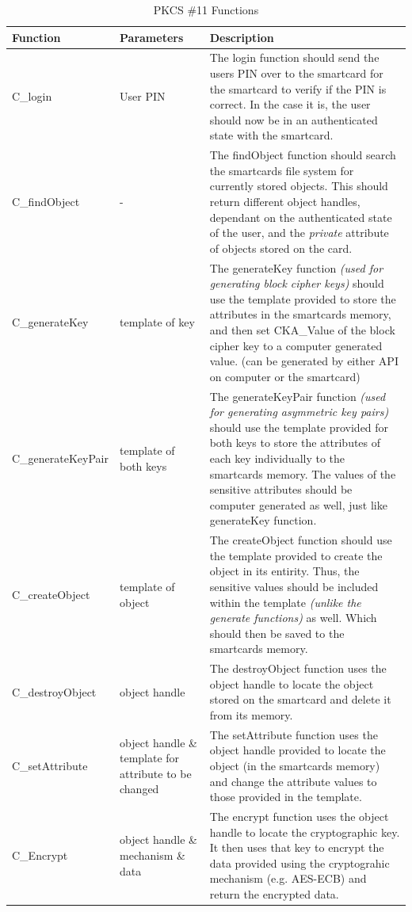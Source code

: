 \documentclass[bsc,frontabs,twoside,singlespacing,parskip,deptreport]{infthesis}     %
\begin{document}
\begin{table}[H]
\hskip-1.5cm\begin{tabular}{|l|p{5cm}|p{8cm}|}
\hline
Function & Parameters & Description\\
\hline
C\_login & User PIN & The login function should send the users PIN over to the smartcard for the smartcard to verify if the PIN is correct. In the case it is, the user should now be in an authenticated state with the smartcard.\\
\hline 
C\_findObject & - & The findObject function should search the smartcards file system for currently stored objects. This should return different object handles, dependant on the authenticated state of the user, and the \textit{private} attribute of objects stored on the card.\\
\hline
C\_generateKey & template of key & The generateKey function \textit{(used for generating block cipher keys)} should use the template provided to store the attributes in the smartcards memory, and then set CKA\_Value of the block cipher key to a computer generated value. (can be generated by either API on computer or the smartcard)\\
\hline 
C\_generateKeyPair & template of both keys & The generateKeyPair function \textit{(used for generating asymmetric key pairs)} should use the template provided for both keys to store the attributes of each key individually to the smartcards memory. The values of the sensitive attributes should be computer generated as well, just like generateKey function.\\
\hline
C\_createObject & template of object & The createObject function should use the template provided to create the object in its entirity. Thus, the sensitive values should be included within the template \textit{(unlike the generate functions)} as well. Which should then be saved to the smartcards memory.\\
\hline
C\_destroyObject & object handle & The destroyObject function uses the object handle to locate the object stored on the smartcard and delete it from its memory. \\
\hline 
C\_setAttribute & object handle \& template for attribute to be changed & The setAttribute function uses the object handle provided to locate the object (in the smartcards memory) and change the attribute values to those provided in the template. \\
\hline
C\_Encrypt & object handle \& mechanism \& data & The encrypt function uses the object handle to locate the cryptographic key. It then uses that key to encrypt the data provided using the cryptograhic mechanism (e.g. AES-ECB) and return the encrypted data. \\
\hline
\end{tabular}
\caption{PKCS \#11 Functions}
\end{table}
\end{document}
